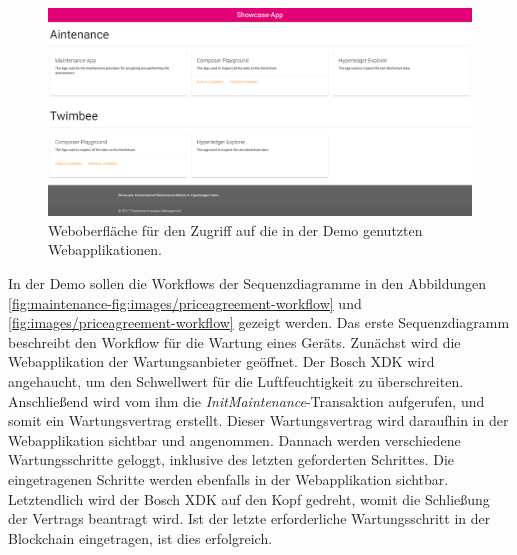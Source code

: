 \begin{figure}[htb]
    \centering
      \includegraphics[width=1.0\textwidth,angle=0]{images/showcase-app}
       \caption{Weboberfläche für den Zugriff auf die in der Demo genutzten Webapplikationen.}
      \label{fig:showcase-app}
\end{figure}

In der Demo sollen die Workflows der Sequenzdiagramme in den Abbildungen \ref{fig:maintenance-fig:images/priceagreement-workflow} und \ref{fig:images/priceagreement-workflow} gezeigt werden. Das erste Sequenzdiagramm beschreibt den Workflow für die Wartung eines Geräts. Zunächst wird die Webapplikation der Wartungsanbieter geöffnet. Der Bosch XDK wird angehaucht, um den Schwellwert für die Luftfeuchtigkeit zu überschreiten. Anschließend wird vom ihm die \textit{InitMaintenance}-Transaktion aufgerufen, und somit ein Wartungsvertrag erstellt. Dieser Wartungsvertrag wird daraufhin in der Webapplikation sichtbar und angenommen. Dannach werden verschiedene Wartungsschritte geloggt, inklusive des letzten geforderten Schrittes. Die eingetragenen Schritte werden ebenfalls in der Webapplikation sichtbar. Letztendlich wird der Bosch XDK auf den Kopf gedreht, womit die Schließung der Vertrags beantragt wird. Ist der letzte erforderliche Wartungsschritt in der Blockchain eingetragen, ist dies erfolgreich.

